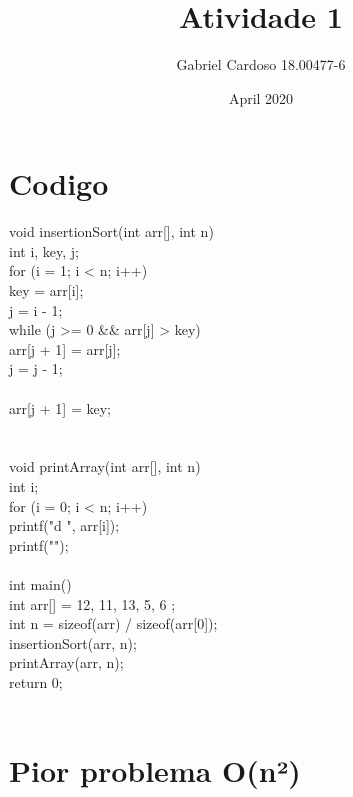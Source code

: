\documentclass{article}
\title{Atividade 1}
\author{Gabriel Cardoso 18.00477-6}
\date{April 2020}
\begin{document}
\maketitle
\section*{Codigo}
void insertionSort(int arr[], int n){\\
    int i, key, j;\\
    for (i = 1; i < n; i++) {\\
        key = arr[i];\\
        j = i - 1;\\
        while (j >= 0 && arr[j] > key) {\\
            arr[j + 1] = arr[j];\\
            j = j - 1;\\
        }\\
        arr[j + 1] = key;\\
    }\\
}\\
void printArray(int arr[], int n){\\
    int i;\\
    for (i = 0; i < n; i++)\\
        printf("d ", arr[i]);\\
    printf("\n");\\
}\\
int main(){\\
    int arr[] = { 12, 11, 13, 5, 6 };\\
    int n = sizeof(arr) / sizeof(arr[0]);\\
    insertionSort(arr, n);\\
    printArray(arr, n);\\
    return 0;\\
}\\
\section*{Pior problema O(n²)}
\end{document}
